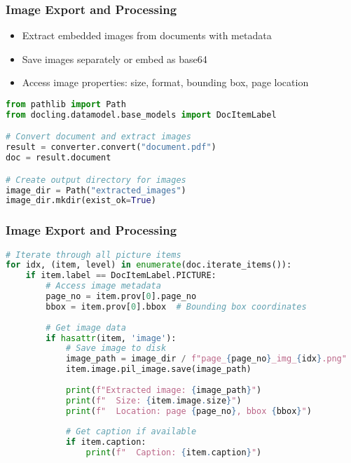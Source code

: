\begin{frame}[fragile]\frametitle{Image Export and Processing}
      \begin{itemize}
          \item Extract embedded images from documents with metadata
          \item Save images separately or embed as base64
          \item Access image properties: size, format, bounding box, page location
      \end{itemize}
      
\begin{lstlisting}[language=Python, basicstyle=\tiny]
from pathlib import Path
from docling.datamodel.base_models import DocItemLabel

# Convert document and extract images
result = converter.convert("document.pdf")
doc = result.document

# Create output directory for images
image_dir = Path("extracted_images")
image_dir.mkdir(exist_ok=True)
\end{lstlisting}
\end{frame}



\begin{frame}[fragile]\frametitle{Image Export and Processing}
      
\begin{lstlisting}[language=Python, basicstyle=\tiny]
# Iterate through all picture items
for idx, (item, level) in enumerate(doc.iterate_items()):
    if item.label == DocItemLabel.PICTURE:
        # Access image metadata
        page_no = item.prov[0].page_no
        bbox = item.prov[0].bbox  # Bounding box coordinates
        
        # Get image data
        if hasattr(item, 'image'):
            # Save image to disk
            image_path = image_dir / f"page_{page_no}_img_{idx}.png"
            item.image.pil_image.save(image_path)
            
            print(f"Extracted image: {image_path}")
            print(f"  Size: {item.image.size}")
            print(f"  Location: page {page_no}, bbox {bbox}")
            
            # Get caption if available
            if item.caption:
                print(f"  Caption: {item.caption}")
\end{lstlisting}
\end{frame}

